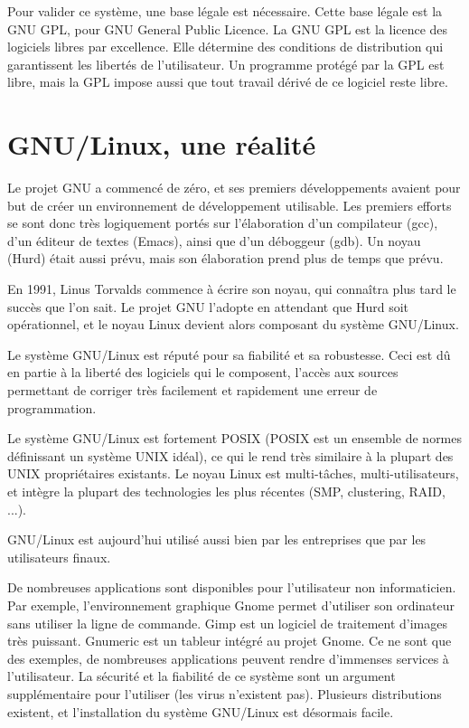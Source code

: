 \documentclass{article}
\begin{document}
Pour valider ce système, une base légale est nécessaire. Cette base légale est la GNU GPL, pour GNU General Public Licence. La GNU GPL est la licence des logiciels libres par excellence. Elle détermine des conditions de distribution qui garantissent les libertés de l'utilisateur. Un programme protégé par la GPL est libre, mais la GPL impose aussi que tout travail dérivé de ce logiciel reste libre.
\section{GNU/Linux, une réalité}

Le projet GNU a commencé de zéro, et ses premiers développements avaient pour but de créer un environnement de développement utilisable. Les premiers efforts se sont donc très logiquement portés sur l'élaboration d'un compilateur (gcc), d'un éditeur de textes (Emacs), ainsi que d'un déboggeur (gdb). Un noyau (Hurd) était aussi prévu, mais son élaboration prend plus de temps que prévu.

En 1991, Linus Torvalds commence à écrire son noyau, qui connaîtra plus tard le succès que l'on sait. Le projet GNU l'adopte en attendant que Hurd soit opérationnel, et le noyau Linux devient alors composant du système GNU/Linux.

Le système GNU/Linux est réputé pour sa fiabilité et sa robustesse. Ceci est dû en partie à la liberté des logiciels qui le composent, l'accès aux sources permettant de corriger très facilement et rapidement une erreur de programmation.

Le système GNU/Linux est fortement POSIX (POSIX est un ensemble de normes définissant un système UNIX idéal), ce qui le rend très similaire à la plupart des UNIX propriétaires existants. Le noyau Linux est multi-tâches, multi-utilisateurs, et intègre la plupart des technologies les plus récentes (SMP, clustering, RAID, ...).

GNU/Linux est aujourd'hui utilisé aussi bien par les entreprises que par les utilisateurs finaux.

De nombreuses applications sont disponibles pour l'utilisateur non informaticien. Par exemple, l'environnement graphique Gnome permet d'utiliser son ordinateur sans utiliser la ligne de commande. Gimp est un logiciel de traitement d'images très puissant. Gnumeric est un tableur intégré au projet Gnome. Ce ne sont que des exemples, de nombreuses applications peuvent rendre d'immenses services à l'utilisateur. La sécurité et la fiabilité de ce système sont un argument supplémentaire pour l'utiliser (les virus n'existent pas). Plusieurs distributions existent, et l'installation du système GNU/Linux est désormais facile.
\end{document}
